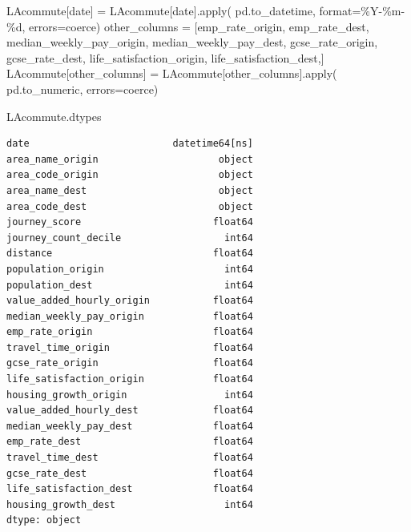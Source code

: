 \documentclass[
  number]{elsarticle}
\newenvironment{Shaded}{\begin{snugshade}}{\end{snugshade}}
\newcommand{\BuiltInTok}[1]{\textcolor[rgb]{0.00,0.23,0.31}{#1}}
\newcommand{\NormalTok}[1]{\textcolor[rgb]{0.00,0.23,0.31}{#1}}
\newcommand{\OperatorTok}[1]{\textcolor[rgb]{0.37,0.37,0.37}{#1}}
\newcommand{\SpecialCharTok}[1]{\textcolor[rgb]{0.37,0.37,0.37}{#1}}
\newcommand{\StringTok}[1]{\textcolor[rgb]{0.13,0.47,0.30}{#1}}
\begin{document}
\begin{Shaded}
\begin{Highlighting}[]
\NormalTok{LAcommute[}\StringTok{\textquotesingle{}date\textquotesingle{}}\NormalTok{] }\OperatorTok{=}\NormalTok{ LAcommute[}\StringTok{\textquotesingle{}date\textquotesingle{}}\NormalTok{].}\BuiltInTok{apply}\NormalTok{(}
\NormalTok{    pd.to\_datetime, }\BuiltInTok{format}\OperatorTok{=}\StringTok{\textquotesingle{}\%Y{-}\%m{-}}\SpecialCharTok{\%d}\StringTok{\textquotesingle{}}\NormalTok{, errors}\OperatorTok{=}\StringTok{\textquotesingle{}coerce\textquotesingle{}}\NormalTok{)}
\NormalTok{other\_columns }\OperatorTok{=}\NormalTok{ [}\StringTok{\textquotesingle{}emp\_rate\_origin\textquotesingle{}}\NormalTok{, }\StringTok{\textquotesingle{}emp\_rate\_dest\textquotesingle{}}\NormalTok{,}
                      \StringTok{\textquotesingle{}median\_weekly\_pay\_origin\textquotesingle{}}\NormalTok{, }\StringTok{\textquotesingle{}median\_weekly\_pay\_dest\textquotesingle{}}\NormalTok{,}
                      \StringTok{\textquotesingle{}gcse\_rate\_origin\textquotesingle{}}\NormalTok{, }\StringTok{\textquotesingle{}gcse\_rate\_dest\textquotesingle{}}\NormalTok{,}
                      \StringTok{\textquotesingle{}life\_satisfaction\_origin\textquotesingle{}}\NormalTok{, }\StringTok{\textquotesingle{}life\_satisfaction\_dest\textquotesingle{}}\NormalTok{,]}
\NormalTok{LAcommute[other\_columns] }\OperatorTok{=}\NormalTok{ LAcommute[other\_columns].}\BuiltInTok{apply}\NormalTok{(}
\NormalTok{    pd.to\_numeric, errors}\OperatorTok{=}\StringTok{\textquotesingle{}coerce\textquotesingle{}}\NormalTok{)}

\NormalTok{LAcommute.dtypes}
\end{Highlighting}
\end{Shaded}

\begin{verbatim}
date                         datetime64[ns]
area_name_origin                     object
area_code_origin                     object
area_name_dest                       object
area_code_dest                       object
journey_score                       float64
journey_count_decile                  int64
distance                            float64
population_origin                     int64
population_dest                       int64
value_added_hourly_origin           float64
median_weekly_pay_origin            float64
emp_rate_origin                     float64
travel_time_origin                  float64
gcse_rate_origin                    float64
life_satisfaction_origin            float64
housing_growth_origin                 int64
value_added_hourly_dest             float64
median_weekly_pay_dest              float64
emp_rate_dest                       float64
travel_time_dest                    float64
gcse_rate_dest                      float64
life_satisfaction_dest              float64
housing_growth_dest                   int64
dtype: object
\end{verbatim}
\end{document}
